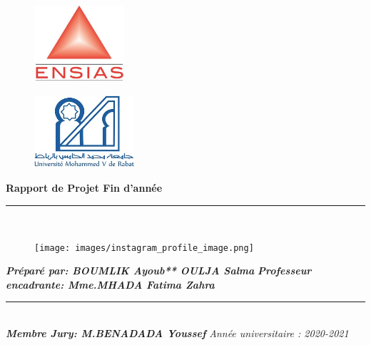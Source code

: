 \documentclass[a4paper]{report}
\begin{document}
\begin{titlepage}
\begin{center}
\begin{figure}[!h]
\vspace{- 2 cm}
\hspace{ 0 cm}
\includegraphics[width=9em]{images/ensias.jpeg}
\end{figure}
\begin{figure}[!h]
\vspace{- 3.97cm}
\hspace{14 cm}
\includegraphics[width=10em]{images/um5.jpeg}
\end{figure}
\end{center}

\begin{center}
\noindent \hspace{ 0.3 cm }\Huge \textbf{ Rapport de Projet  Fin d’année } 
\vspace*{0.1cm}

\vspace*{0.1cm}
\begin{center}
 \rule{0.9\linewidth}{1pt}
\end{center}
\begin{center}

\noindent {} \\ 
 \end{center} 


\vspace*{0.5cm} \noindent \hspace{ -0.5 cm} \large 
\begin{figure}[H]
    \begin{center}
    \texttt{[image: images/instagram\_profile\_image.png]}
    \end{center}
\end{figure}
\raggedright
{\textbf{\emph{Préparé par: BOUMLIK Ayoub** OULJA Salma}}}
\raggedleft
{\textbf{\emph{Professeur encadrante: Mme.MHADA Fatima Zahra}}}

\rule{0.7\linewidth}{2pt}\\
\raggedleft
{\textbf{\emph{Membre Jury: M.BENADADA Youssef
}}}
\Large \emph{Année universitaire : 2020-2021} 

\end{center}
\end{titlepage}
\end{document}
